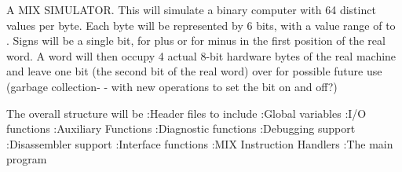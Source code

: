 
%
%
%
%

\def\>{\hskip 5em}


A MIX SIMULATOR.
This will simulate a binary  computer with 64 distinct
values per byte.
Each byte will be represented by 6 bits, with a value range of
 to .
Signs will be a single bit,  for plus or  for minus in the
first position
of the real word.
A word will then occupy 4 actual 8-bit hardware bytes of the real machine
and leave one bit (the second bit of the real word) over for possible future
use (garbage collection- - with new operations to set the bit on and off?)

\fi

The overall structure will be
\Y\B{}:Header files to include\X\6
:Global variables\X\6
:I/O functions\X\6
:Auxiliary Functions\X\6
:Diagnostic functions\X\6
:Debugging support\X\6
:Disassembler support\X\6
:Interface functions\X\6
:MIX Instruction Handlers\X\6
:The main program\X\par
\fi

